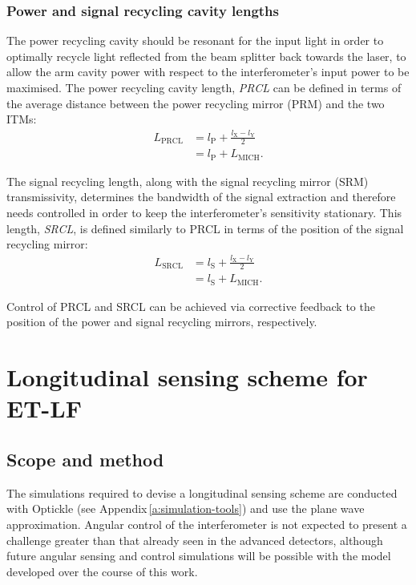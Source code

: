 \subsubsection{Power and signal recycling cavity lengths}
The power recycling cavity should be resonant for the input light in order to optimally recycle light reflected from the beam splitter back towards the laser, to allow the arm cavity power with respect to the interferometer's input power to be maximised. The power recycling cavity length, \emph{\gls{PRCL}} can be defined in terms of the average distance between the power recycling mirror (\gls{PRM}) and the two \glspl{ITM}:
\begin{equation}
  \label{eq:prcl-length}
  \begin{split}
    L_{\text{PRCL}} &= l_{\text{P}} + \frac{l_{\text{X}} - l_{\text{Y}}}{2} \\
		    &= l_{\text{P}} + L_{\text{MICH}}.
  \end{split}
\end{equation}

The signal recycling length, along with the signal recycling mirror (\gls{SRM}) transmissivity, determines the bandwidth of the signal extraction and therefore needs controlled in order to keep the interferometer's sensitivity stationary. This length, \emph{\gls{SRCL}}, is defined similarly to \gls{PRCL} in terms of the position of the signal recycling mirror:
\begin{equation}
  \label{eq:srcl-length}
  \begin{split}
    L_{\text{SRCL}} &= l_{\text{S}} + \frac{l_{\text{X}} - l_{\text{Y}}}{2} \\
		    &= l_{\text{S}} + L_{\text{MICH}}.
  \end{split}
\end{equation}

Control of \gls{PRCL} and \gls{SRCL} can be achieved via corrective feedback to the position of the power and signal recycling mirrors, respectively.

\section{Longitudinal sensing scheme for ET-LF}

\subsection{Scope and method}
The simulations required to devise a longitudinal sensing scheme are conducted with Optickle (see Appendix\,\ref{a:simulation-tools}) and use the plane wave approximation. Angular control of the interferometer is not expected to present a challenge greater than that already seen in the advanced detectors, although future angular sensing and control simulations will be possible with the model developed over the course of this work.

